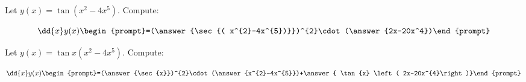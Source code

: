 \documentclass{ximera}
\author{Bart Snapp\and Nela lakos}
\begin{document}
\begin{exercise}
Let $y(x) = \tan{ \left( x^{2}-4x^{5}\right)}$. Compute:

\[
\dd{x}y(x)
\begin{prompt}=(\answer{\sec{( x^{2}-4x^{5})}})^{2}\cdot(\answer{2x-20x^4})\end{prompt}
\]
\end{exercise}
\begin{exercise}
Let $y(x) = \tan{x} \left( x^{2}-4x^{5}\right)$. Compute:

\[
\dd{x}y(x)
\begin{prompt}=(\answer{\sec{x}})^{2}\cdot(\answer{x^{2}-4x^{5}})+\answer{ \tan{x} \left( 2x-20x^{4}\right)}\end{prompt}
\]
\end{exercise}
\end{document}
